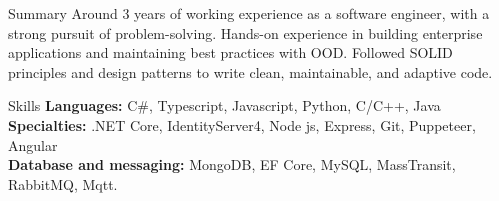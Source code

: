 \documentclass{resume}
\begin{document}

\begin{rSection}{Summary}
Around 3 years of working experience as a software engineer, with a strong pursuit of problem-solving.
Hands-on experience in building enterprise applications and maintaining best practices with OOD.
Followed SOLID principles and design patterns to write clean, maintainable, and adaptive code.
\end{rSection}


\begin{rSection}{Skills}
{\bf Languages:} C\#, Typescript, Javascript, Python, C/C++, Java\\
{\bf Specialties:} .NET Core, IdentityServer4, Node js, Express, Git, Puppeteer, Angular\\
{\bf Database and messaging:} MongoDB, EF Core, MySQL, MassTransit, RabbitMQ, Mqtt.
\end{rSection}

\end{document}
